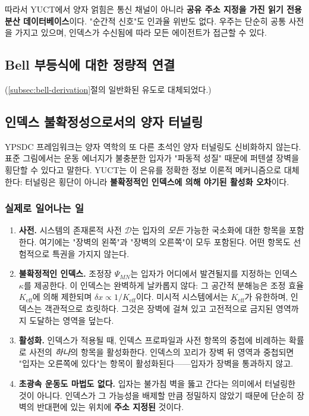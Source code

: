 \documentclass[12pt,a4paper]{article}
\begin{document}
	따라서 YUCT에서 양자 얽힘은 통신 채널이 아니라 \textbf{공유 주소 지정을 가진 읽기 전용 분산 데이터베이스}이다. "순간적 신호"도 인과율 위반도 없다. 우주는 단순히 공통 사전을 가지고 있으며, 인덱스가 수신됨에 따라 모든 에이전트가 접근할 수 있다.
	
	\subsection{Bell 부등식에 대한 정량적 연결}
	\label{subsec:bell-inequalities}
	
	(\ref{subsec:bell-derivation}절의 일반화된 유도로 대체되었다.)
	
	\subsection{인덱스 불확정성으로서의 양자 터널링}
	
	YPSDC 프레임워크는 양자 역학의 또 다른 초석인 양자 터널링도 신비화하지 않는다. 표준 그림에서는 운동 에너지가 불충분한 입자가 "파동적 성질" 때문에 퍼텐셜 장벽을 횡단할 수 있다고 말한다. YUCT는 이 은유를 정확한 정보 이론적 메커니즘으로 대체한다: 터널링은 횡단이 아니라 \textbf{불확정적인 인덱스에 의해 야기된 활성화 오차}이다.
	
	\subsubsection{실제로 일어나는 일}
	
	\begin{enumerate}[leftmargin=*]
		\item \textbf{사전.}
		시스템의 존재론적 사전 $\mathcal{D}$는 입자의 \emph{모든} 가능한 국소화에 대한 항목을 포함한다. 여기에는 "장벽의 왼쪽"과 "장벽의 오른쪽"이 모두 포함된다. 어떤 항목도 선험적으로 특권을 가지지 않는다.
		
		\item \textbf{불확정적인 인덱스.}
		조정장 $\Psi_{MN}$는 입자가 어디에서 발견될지를 지정하는 인덱스 $\kappa$를 제공한다. 이 인덱스는 완벽하게 날카롭지 않다: 그 공간적 분해능은 조정 효율 $K_{\mathrm{eff}}$에 의해 제한되며 $\delta x \propto 1/K_{\mathrm{eff}}$이다. 미시적 시스템에서는 $K_{\mathrm{eff}}$가 유한하며, 인덱스는 객관적으로 흐릿하다. 그것은 장벽에 걸쳐 있고 고전적으로 금지된 영역까지 도달하는 영역을 덮는다.
		
		\item \textbf{활성화.}
		인덱스가 적용될 때, 인덱스 프로파일과 사전 항목의 중첩에 비례하는 확률로 사전의 \emph{하나}의 항목을 활성화한다. 인덱스의 꼬리가 장벽 뒤 영역과 중첩되면 "입자는 오른쪽에 있다"는 항목이 활성화된다——입자가 장벽을 통과하지 않고.
		
		\item \textbf{초광속 운동도 마법도 없다.}
		입자는 불가침 벽을 뚫고 간다는 의미에서 터널링한 것이 아니다. 인덱스가 그 가능성을 배제할 만큼 정밀하지 않았기 때문에 단순히 장벽의 반대편에 있는 위치에 \textbf{주소 지정된} 것이다.
	\end{enumerate}
	
\end{document}

